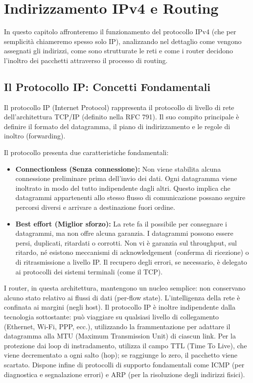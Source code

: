 \chapter{Indirizzamento IPv4 e Routing}

In questo capitolo affronteremo il funzionamento del protocollo IPv4 (che per semplicità chiameremo spesso solo IP), analizzando nel dettaglio come vengono assegnati gli indirizzi, come sono strutturate le reti e come i router decidono l'inoltro dei pacchetti attraverso il processo di routing.

\section{Il Protocollo IP: Concetti Fondamentali}
Il protocollo IP (Internet Protocol) rappresenta il protocollo di livello di rete dell'architettura TCP/IP (definito nella RFC 791). Il suo compito principale è definire il formato del datagramma, il piano di indirizzamento e le regole di inoltro (forwarding). 

Il protocollo presenta due caratteristiche fondamentali:
\begin{itemize}
    \item \textbf{Connectionless (Senza connessione):} Non viene stabilita alcuna connessione preliminare prima dell'invio dei dati. Ogni datagramma viene inoltrato in modo del tutto indipendente dagli altri. Questo implica che datagrammi appartenenti allo stesso flusso di comunicazione possano seguire percorsi diversi e arrivare a destinazione fuori ordine.
    \item \textbf{Best effort (Miglior sforzo):} La rete fa il possibile per consegnare i datagrammi, ma non offre alcuna garanzia. I datagrammi possono essere persi, duplicati, ritardati o corrotti. Non vi è garanzia sul throughput, sul ritardo, né esistono meccanismi di acknowledgement (conferma di ricezione) o di ritrasmissione a livello IP. Il recupero degli errori, se necessario, è delegato ai protocolli dei sistemi terminali (come il TCP).
\end{itemize}

I router, in questa architettura, mantengono un nucleo semplice: non conservano alcuno stato relativo ai flussi di dati (per-flow state). L'intelligenza della rete è confinata ai margini (negli host). 
Il protocollo IP è inoltre indipendente dalla tecnologia sottostante: può viaggiare su qualsiasi livello di collegamento (Ethernet, Wi-Fi, PPP, ecc.), utilizzando la frammentazione per adattare il datagramma alla MTU (Maximum Transmission Unit) di ciascun link. 
Per la protezione dai loop di instradamento, utilizza il campo TTL (Time To Live), che viene decrementato a ogni salto (hop); se raggiunge lo zero, il pacchetto viene scartato. Dispone infine di protocolli di supporto fondamentali come ICMP (per diagnostica e segnalazione errori) e ARP (per la risoluzione degli indirizzi fisici).


